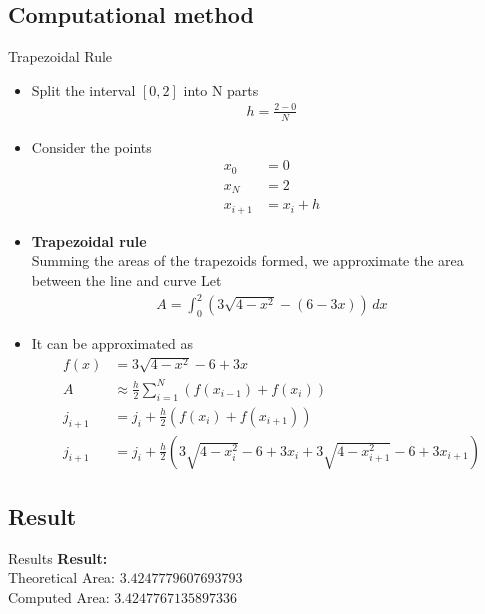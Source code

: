 \documentclass{beamer}
\providecommand{\sbrak}[1]{\ensuremath{{}\left[#1\right]}}
\providecommand{\brak}[1]{\ensuremath{\left(#1\right)}}
\theoremstyle{remark}
\numberwithin{equation}{section}
\begin{document}
        \subsection{Computational method}
        \begin{frame}{Trapezoidal Rule}
            \begin{itemize}
    \item Split the interval \sbrak{0,2} into N parts
    \begin{align}
        h = \frac{2 - 0}{N}
    \end{align}
    \item Consider the points 
    \begin{align}
        x_0 &= 0\\
        x_N &= 2\\
        x_{i + 1} &= x_i + h
    \end{align}
    \item \textbf{Trapezoidal rule}\\
    Summing the areas of the trapezoids formed, we approximate the area between the line and curve
    Let 
    \begin{align}
        A = \int_0^2{\brak{3\sqrt{4 - x^2} - \brak{6 - 3x}}\,dx}
    \end{align}
    \item It can be approximated as 
    \begin{align}
        f(x) &= 3\sqrt{4 - x^2} - 6 + 3x \\
        A &\approx \frac{h}{2} \sum_{i = 1}^{N}{\brak{f\brak{x_{i - 1}} + f\brak{x_i}}}\\
        j_{i + 1} &= j_i + \frac{h}{2}\brak{f\brak{x_i} + f\brak{x_{i + 1}}}\\
        j_{i + 1} &= j_i + \frac{h}{2}\brak{3\sqrt{4 - x_i^2} - 6 + 3x_i + 3\sqrt{4 - x_{i+1}^2} - 6 + 3x_{i + 1}}
    \end{align}
\end{itemize}
        \end{frame}

        \subsection{Result}
        \begin{frame}{Results}
            \textbf{Result:}\\
Theoretical Area: $3.4247779607693793$\\
Computed Area: $3.4247767135897336$
        \end{frame}
\end{document}
